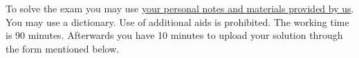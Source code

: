{    To solve the exam you may use \underline{your personal notes and materials provided by us}. You may use a dictionary. Use of additional aids is prohibited. The working time is 90 minutes.
	Afterwards you have 10 minutes to upload your solution through the form mentioned below.
    \hspace{0pt}

    \vfill
}
